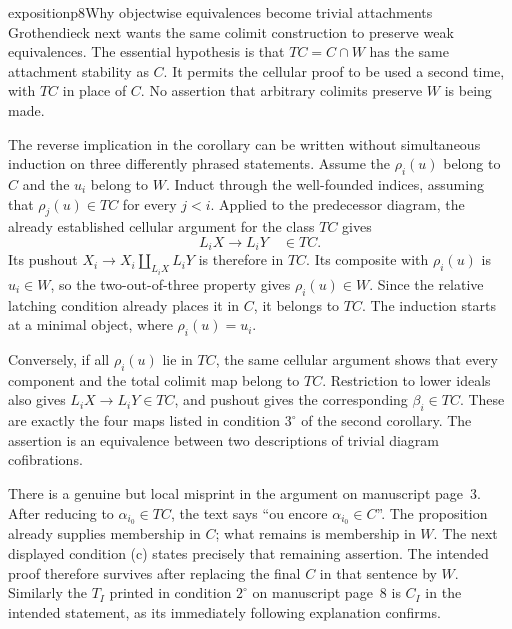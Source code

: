 \begin{dcomment}{exposition}{p8}{Why objectwise equivalences become trivial attachments}
Grothendieck next wants the same colimit construction to preserve weak equivalences. The essential hypothesis is that $TC=C\cap W$ has the same attachment stability as $C$. It permits the cellular proof to be used a second time, with $TC$ in place of $C$. No assertion that arbitrary colimits preserve $W$ is being made.

The reverse implication in the corollary can be written without simultaneous induction on three differently phrased statements. Assume the $\rho_i(u)$ belong to $C$ and the $u_i$ belong to $W$. Induct through the well-founded indices, assuming that $\rho_j(u)\in TC$ for every $j<i$. Applied to the predecessor diagram, the already established cellular argument for the class $TC$ gives
\[
 L_iX\longrightarrow L_iY\quad\in TC.
\]
Its pushout $X_i\to X_i\amalg_{L_iX}L_iY$ is therefore in $TC$. Its composite with $\rho_i(u)$ is $u_i\in W$, so the two-out-of-three property gives $\rho_i(u)\in W$. Since the relative latching condition already places it in $C$, it belongs to $TC$. The induction starts at a minimal object, where $\rho_i(u)=u_i$.

Conversely, if all $\rho_i(u)$ lie in $TC$, the same cellular argument shows that every component and the total colimit map belong to $TC$. Restriction to lower ideals also gives $L_iX\to L_iY\in TC$, and pushout gives the corresponding $\beta_i\in TC$. These are exactly the four maps listed in condition $3^\circ$ of the second corollary. The assertion is an equivalence between two descriptions of trivial diagram cofibrations.

There is a genuine but local misprint in the argument on manuscript page~3. After reducing to $\alpha_{i_0}\in TC$, the text says ``ou encore $\alpha_{i_0}\in C$''. The proposition already supplies membership in $C$; what remains is membership in $W$. The next displayed condition (c) states precisely that remaining assertion. The intended proof therefore survives after replacing the final $C$ in that sentence by $W$. Similarly the $T_I$ printed in condition $2^\circ$ on manuscript page~8 is $C_I$ in the intended statement, as its immediately following explanation confirms.
\end{dcomment}

